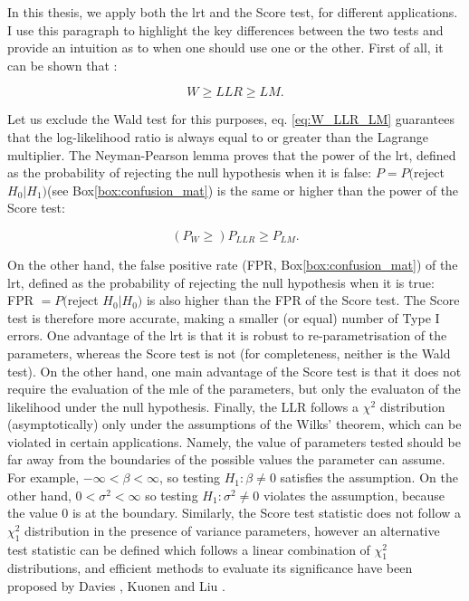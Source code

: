 In this thesis, we apply both the \gls{lrt} and the Score test, for different applications.
I use this paragraph to highlight the key differences between the two tests and provide an intuition as to when one should use one or the other.
First of all, it can be shown that \cite{engle1984wald}:

\begin{equation}\label{eq:W_LLR_LM}
    W \geq LLR \geq LM.
\end{equation}

Let us exclude the Wald test for this purposes, eq. \eqref{eq:W_LLR_LM} guarantees that the log-likelihood ratio is always equal to or greater than the Lagrange multiplier.
The Neyman-Pearson lemma \cite{neyman1933ix} proves that the power  of the \gls{lrt}, defined as the probability of rejecting the null hypothesis when it is false: $P = P($reject $H_0 | H_1)$(see Box\ref{box:confusion_mat}) is the same or higher than the power of the Score test:

\begin{equation}
    (P_W \geq) P_{LLR} \geq P_{LM}.
\end{equation}

On the other hand, the false positive rate (FPR, Box\ref{box:confusion_mat}) of the \gls{lrt}, defined as the probability of rejecting the null hypothesis when it is true: FPR $= P($reject $H_0 | H_0)$ is also higher than the FPR of the Score test.
The Score test is therefore more accurate, making a smaller (or equal) number of Type I errors. 
One advantage of the \gls{lrt} is that it is robust to re-parametrisation of the parameters, whereas the Score test is not (for completeness, neither is the Wald test). 
On the other hand, one main advantage of the Score test is that it does not require the evaluation of the \gls{mle} of the parameters, but only the evaluaton of the likelihood under the null hypothesis.
Finally, the LLR follows a $\chi^2$ distribution (asymptotically) only under the assumptions of the Wilks' theorem, which can be violated in certain applications.
Namely, the value of parameters tested should be far away from the boundaries of the possible values the parameter can assume.
For example, $-\infty < \beta < \infty$, so testing $H_1: \beta \neq 0$ satisfies the assumption.
On the other hand, $0 < \sigma^2 < \infty$ so testing $H_1: \sigma^2 \neq 0$ violates the assumption, because the value $0$ is at the boundary.
Similarly, the Score test statistic does not follow a $\chi^2_1$ distribution in the presence of variance parameters, however an alternative test statistic can be defined which follows a linear combination of $\chi^2_1$ distributions, and efficient methods to evaluate its significance have been proposed by Davies \cite{davies1980algorithm}, Kuonen \cite{kuonen1999miscellanea} and Liu \cite{liu2009new, lee2012optimal}. \\

